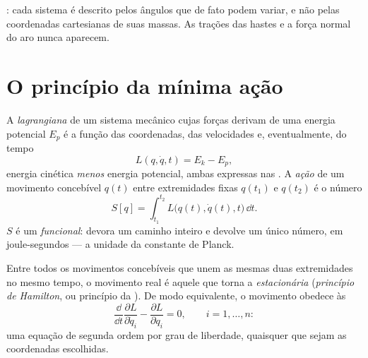 \begin{omfigure}
{\small {}: cada sistema é descrito pelos
ângulos que de fato podem variar, e não pelas coordenadas cartesianas
de suas massas. As trações das hastes e a força normal do aro nunca
aparecem.}
\end{omfigure}

\section{O princípio da mínima ação}

\begin{definition}\label{def:b3:lagrangian-mechanics:action}
A \emph{lagrangiana} de um sistema mecânico cujas forças derivam de uma
energia potencial $E_p$ é a função das coordenadas, das velocidades e,
eventualmente, do tempo
\[
L(q, \dot q, t) = E_k - E_p ,
\]
energia cinética \emph{menos} energia potencial, ambas expressas nas
. A \emph{ação} de um movimento concebível
$q(t)$ entre extremidades fixas $q(t_1)$ e $q(t_2)$ é o número
\[
S[q] = \int_{t_1}^{t_2} L\big(q(t), \dot q(t), t\big)\,\dd t .
\]
$S$ é um \emph{funcional}: devora um caminho inteiro e devolve um único
número, em joule-segundos --- a unidade da constante de Planck.
\end{definition}

\begin{theorem}\label{thm:b3:lagrangian-mechanics:euler-lagrange}
Entre todos os movimentos concebíveis que unem as mesmas duas
extremidades no mesmo tempo, o movimento real é aquele que torna a 
\emph{estacionária} (\emph{princípio de Hamilton}, ou princípio da
\emph{}). De modo equivalente, o movimento obedece às
\emph{}
\[
\frac{\dd}{\dd t}\frac{\partial L}{\partial\dot q_i}
 - \frac{\partial L}{\partial q_i} = 0 ,
\qquad i = 1, \dots, n :
\]
uma equação de segunda ordem por grau de liberdade, quaisquer que
sejam as coordenadas escolhidas.
\end{theorem}

